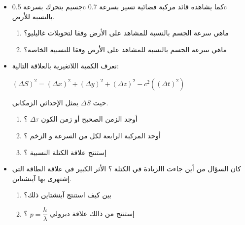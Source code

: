 \documentclass[a4paper,14pt]{article}
\begin{document}
\subsubsection*{\uline{}}
	
\begin{itemize}
	\item 
	جسيم يتحرك بسرعة 0.5c كما يشاهده قائد مركبة فضائية تسير بسرعة 0.7c  بالنسبة للأرض.

	
	
	\begin{enumerate}
				
		\item 
	ماهي سرعة الجسم بالنسبة للمشاهد على اﻷرض وفقا لتحويلات غاليليو؟
		\item
	ماهي سرعة الجسم بالنسبة للمشاهد على اﻷرض وفقا للنسبية الخاصة؟
				
		\end{enumerate}	
	\item
	نعرف الكمية اللاتغيرية بالعلاقة التالية:\\	
\begin{center}
		$ (\Delta S)^{2} = (\Delta x)^{2} +(\Delta y)^{2} +(\Delta z)^{2} -c^{2}((\Delta t)^{2}) $
\end{center}
	
حيث $ \Delta S $ يمثل الإحداثي الزمكاني. 
	
	\begin{enumerate}
		
		\item 
		أوجد الزمن الصحيح أو زمن الكون 	$ \Delta\tau $ ؟
		\item
		أوجد المركبة الرابعة لكل من السرعة و الزخم ؟
		\item
		إستنتج علاقة الكتلة النسبية ؟
	\end{enumerate}	
\item
كان السؤال من أين جاءت االزيادة في الكتلة ؟ اﻷثر  الكبير في علاقة الطاقة التي إشتهرى بها آينشتاين. 
	\begin{enumerate}
	
	\item 
بين كيف استنتج آينشتاين ذلك؟
	\item
إستنتج من ذالك علاقة دبرولي  $ p=\dfrac{h}{\lambda} $ ؟
	
   \end{enumerate}	

\end{itemize}	
~~~~~~	
	\\
	\\
	\\
\end{document}
